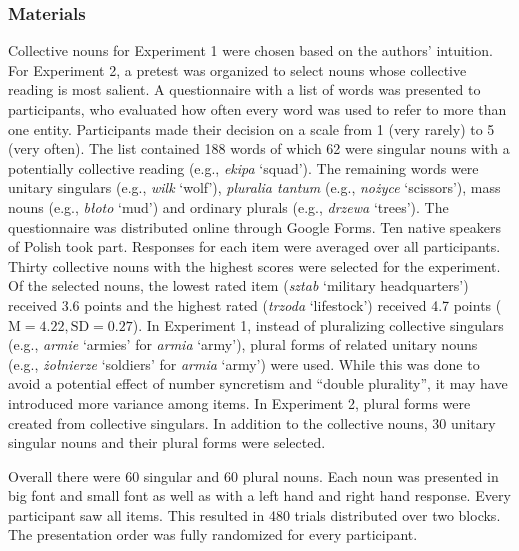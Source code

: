 \documentclass[output=paper]{langscibook}
\begin{document}
\subsubsection{Materials}
Collective nouns for Experiment 1 were chosen based on the authors’ intuition. For Experiment 2, a pretest was organized to select nouns  whose collective reading is most salient. A questionnaire with a list of words was presented to participants, who evaluated how often every word was used to refer to more than one entity. Participants made their decision on a scale from 1 (very rarely) to 5 (very often). The list contained 188 words of which 62 were singular nouns with a potentially collective reading (e.g., \textit{ekipa} ‘squad’). The remaining words were unitary singulars (e.g., \textit{wilk} ‘wolf’), \textit{pluralia tantum} (e.g., \textit{nożyce} ‘scissors’), mass nouns (e.g., \textit{błoto} ‘mud’) and ordinary plurals (e.g., \textit{drzewa} ‘trees’). The questionnaire was distributed online through Google Forms. Ten native speakers of Polish took part. Responses for each item were averaged over all participants. Thirty collective nouns with the highest scores were selected for the experiment. Of the selected nouns, the lowest rated item (\textit{sztab} ‘military headquarters’) received 3.6 points and the highest rated (\textit{trzoda} ‘lifestock’) received 4.7 points ($\text{M}=4.22, \text{SD}=0.27$). In Experiment 1, instead of pluralizing collective singulars (e.g., \textit{armie} ‘armies’ for \textit{armia} ‘army’), plural forms of related unitary nouns (e.g., \textit{żołnierze} ‘soldiers’ for \textit{armia} ‘army’) were used. While this was done to avoid a potential effect of number syncretism and “double plurality”, it may have introduced more variance among items. In Experiment 2, plural forms were created from collective singulars. In addition to the collective nouns, 30 unitary singular nouns and their plural forms were selected. 

Overall there were 60 singular and 60 plural nouns. Each noun was presented in big font and small font as well as with a left hand and right hand response. Every participant saw all items. This resulted in 480 trials distributed over two blocks. The presentation order was fully randomized for every participant.
\end{document}
